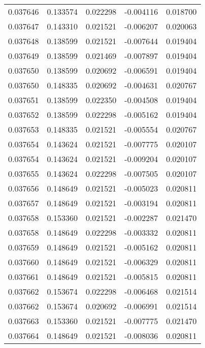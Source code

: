 \begin{tabular}{lrrrr}
0.037646    &  0.133574 &  0.022298 & -0.004116 &             0.018700 \\
0.037647    &  0.143310 &  0.021521 & -0.006207 &             0.020063 \\
0.037648    &  0.138599 &  0.021521 & -0.007644 &             0.019404 \\
0.037649    &  0.138599 &  0.021469 & -0.007897 &             0.019404 \\
0.037650    &  0.138599 &  0.020692 & -0.006591 &             0.019404 \\
0.037650    &  0.148335 &  0.020692 & -0.004631 &             0.020767 \\
0.037651    &  0.138599 &  0.022350 & -0.004508 &             0.019404 \\
0.037652    &  0.138599 &  0.022298 & -0.005162 &             0.019404 \\
0.037653    &  0.148335 &  0.021521 & -0.005554 &             0.020767 \\
0.037654    &  0.143624 &  0.021521 & -0.007775 &             0.020107 \\
0.037654    &  0.143624 &  0.021521 & -0.009204 &             0.020107 \\
0.037655    &  0.143624 &  0.022298 & -0.007505 &             0.020107 \\
0.037656    &  0.148649 &  0.021521 & -0.005023 &             0.020811 \\
0.037657    &  0.148649 &  0.021521 & -0.003194 &             0.020811 \\
0.037658    &  0.153360 &  0.021521 & -0.002287 &             0.021470 \\
0.037658    &  0.148649 &  0.022298 & -0.003332 &             0.020811 \\
0.037659    &  0.148649 &  0.021521 & -0.005162 &             0.020811 \\
0.037660    &  0.148649 &  0.021521 & -0.006329 &             0.020811 \\
0.037661    &  0.148649 &  0.021521 & -0.005815 &             0.020811 \\
0.037662    &  0.153674 &  0.022298 & -0.006468 &             0.021514 \\
0.037662    &  0.153674 &  0.020692 & -0.006991 &             0.021514 \\
0.037663    &  0.153360 &  0.021521 & -0.007775 &             0.021470 \\
0.037664    &  0.148649 &  0.021521 & -0.008036 &             0.020811 \\

\end{tabular}
